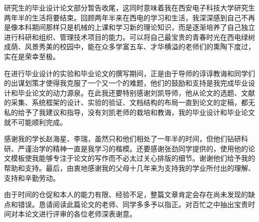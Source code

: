 
\begin{acknowledgments}

研究生的毕业设计论文部分暂告收尾，这同时意味着我在西安电子科技大学研究生两年半的生活将要结束。回顾两年半来在西电的学习和生活，我深深感到自己不再是像本科期间那样只是机械的上课和学习新的理论知识，而是逐渐培养了自己独立进行科研和组织、管理技术项目的能力。可以将自己最宝贵的青春时光在西电绿树成荫、风景秀美的校园中，能在众多学富五车、才华横溢的老师们的熏陶下度过，实在是荣幸至极。

在进行毕业设计的实验和毕业论文的撰写期间，正是由于导师的谆谆教诲和同学们的出谋划策才使得我克服了一个又一个的难题，他们的鼓励和支持是我完成毕业设计和毕业论文的动力源泉。在此我还要特别感谢刘凯导师，他从论文的选题、文献的采集、系统框架的设计、实验的验证、文档结构的布局一直到论文的定稿，都无私的给予了我建议和指导，没有刘凯老师的栽培和教诲，我的毕业设计和毕业论文就不可能顺利完成。

感谢我的学长赵海星、李瑞，虽然只和他们相处了一年半的时间，但他们钻研科研、严谨治学的精神一直是我学习的楷模。还要感谢张劲同学提供的，使用他的论文模板使我能够专注于论文的写作而不必太过关心排版的细节。谢谢他们给予我的帮助和支持。最后，由衷地感谢我的父母十几年来为支持我的学业所付出的理解、支持和辛勤劳动。 

由于时间的仓促和本人的能力有限、经验不足，整篇文章肯定会存在尚未发现的缺点和错误。恳请阅读此篇论文的老师、同学多多予以指正。对百忙之中抽出宝贵时间对本论文进行评审的各位老师深表谢意。

\end{acknowledgments}

